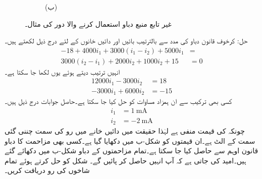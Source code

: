 \begin{figure}
\begin{subfigure}{1\textwidth}
%
\caption*{(ب)}
\end{subfigure}
\caption{غیر تابع منبع دباو استعمال کرنے والا دور کی مثال۔}
\label{شکل_جوڑ_آزاد_منبع_دباو_دائری_مثال_الف}
\end{figure}%

حل: کرخوف قانون دباو کی مدد سے بالترتیب بائیں اور دائیں خانوں کے لئے درج ذیل لکھتے ہیں۔
\begin{align*}
-18+4000 i_1 +3000(i_1-i_2)+5000 i_1&=\\
3000(i_2-i_1)+2000 i_2+1000 i_2+15&=0
\end{align*} 
انہیں ترتیب دیتے ہوئے یوں لکھا جا سکتا ہے۔
\begin{align*}
12000 i_1-3000 i_2&=18\\
-3000 i_1+6000 i_2&=-15
\end{align*}
کسی بھی ترکیب سے ان ہمزاد مساوات کو حل کیا جا سکتا ہے۔حاصل جوابات درج ذیل ہیں۔
\begin{align*}
i_1&=\SI{1}{\milli\ampere}\\
i_2&=\SI{-2}{\milli\ampere}
\end{align*}
چونکہ  کی قیمت منفی ہے لہٰذا حقیقت میں دائیں خانے میں رو کی سمت چننی گئی سمت کے الٹ ہے۔ان قیمتوں کو شکل-ب میں دکھایا گیا ہے۔کسی بھی مزاحمت کا دباو قانون اوہم سے حاصل کیا جا سکتا ہے۔تمام مزاحمتوں کے دباو شکل-ب میں دکھائے گئے ہیں۔امید کی جاتی ہے کہ آپ انہیں حاصل کر پائیں گے۔
شکل  کو حل کرتے ہوئے  تمام شاخوں کی رو دریافت کریں۔

